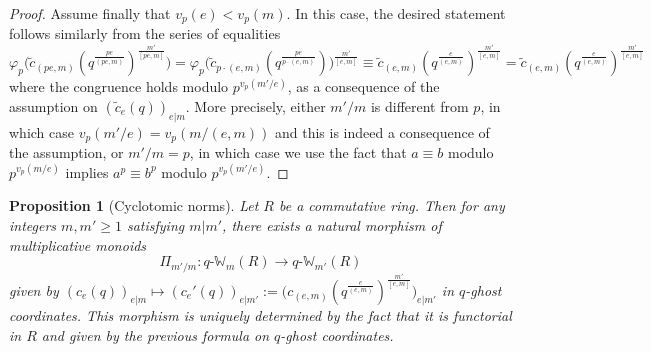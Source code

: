 \documentclass[10pt,twoside]{scrarticle}
\newtheorem{proposition}[theorem]{Proposition}
\theoremstyle{definition}
\newcommand{\qWm}{q\text{-}\mathbb{W}_m}
\newcommand{\qWmm}{q\text{-}\mathbb{W}_{m'}}
\renewcommand{\ge}{\geqslant}
\numberwithin{equation}{theorem}
\begin{document}
\begin{proof}
    Assume finally that $v_p(e)<v_p(m)$. In this case, the desired statement follows similarly from the series of equalities
    $$\varphi_p\big(\tilde{c}_{(pe,m)}(q^{\frac{pe}{(pe,m)}})^{\frac{m'}{[pe,m]}}\big) = \varphi_p\big(\tilde{c}_{p\cdot(e,m)}(q^{\frac{pe}{p\cdot(e,m)}})\big)^{\frac{m'}{[e,m]}} \equiv \tilde{c}_{(e,m)}(q^{\frac{e}{(e,m)}})^{\frac{m'}{[e,m]}} = \tilde{c}_{(e,m)}(q^{\frac{e}{(e,m)}})^{\frac{m'}{[e,m]}}$$
    where the congruence holds modulo $p^{v_p(m'/e)}$, as a consequence of the assumption on $(\tilde{c}_e(q))_{e|m}$.  
    More precisely, either $m'/m$ is different from $p$, in which case $v_p(m'/e)=v_p(m/(e,m))$ and this is indeed a consequence of the assumption, or $m'/m=p$, in which case we use the fact that $a \equiv b$ modulo $p^{v_p(m/e)}$ implies $a^p \equiv b^p$ modulo $p^{v_p(m'/e)}$. 
\end{proof}

\begin{proposition}[Cyclotomic norms]\label{prop:q-angeltveit}
    Let $R$ be a commutative ring. Then for any integers $m,m' \ge 1$ satisfying $m | m'$, there exists a natural morphism of multiplicative monoids
    $$\Pi_{m'/m} : \qWm(R) \longrightarrow \qWmm(R)$$
    given by $(c_e(q))_{e|m} \mapsto (c_e'(q))_{e|m'} := \big(c_{(e,m)}(q^{\frac{e}{(e,m)}})^{\frac{m'}{[e,m]}}\big)_{e|m'}$ in $q$-ghost coordinates. This morphism is uniquely determined by the fact that it is functorial in $R$ and given by the previous formula on $q$-ghost coordinates.
\end{proposition}
\end{document}
